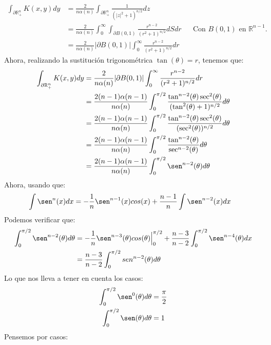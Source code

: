 \begin{homeworkProblem}
\begin{enumerate}
\begin{solucion}
\begin{align*}
        \int_{\partial \mathbb{R}^{n}_{+}}K(x,y)dy&=\frac{2}{n\alpha(n)}\int_{\partial \mathbb{R}^{n}_{+}}\frac{1}{(|z|^2+1)^{n/2}}dz\\
        &=\frac{2}{n\alpha(n)} \int_{0}^{\infty}\int_{\partial B(0,1)}\frac{r^{n-2}}{(r^2+1)^{n/2}}dSdr &&\text{Con $B(0,1)$ en $\mathbb{R}^{n-1}$.}\\
        &=\frac{2}{n\alpha(n)}|\partial B(0,1)|\int_{0}^{\infty}\frac{r^{n-2}}{(r^2+1)^{n/2}}dr
      \end{align*}
      Ahora, realizando la sustitución trigonométrica $\tan(\theta)=r$, tenemos que:
      \begin{align*}
        \int_{\partial \mathbb{R}^{n}_{+}}K(x,y)dy&=\frac{2}{n\alpha(n)}|\partial B(0,1)|\int_{0}^{\infty}\frac{r^{n-2}}{(r^2+1)^{n/2}}dr\\
        &=\frac{2(n-1)\alpha(n-1)}{n\alpha(n)}\int_{0}^{\pi/2}\frac{\tan^{n-2}(\theta)\sec^2(\theta)}{(\tan^2(\theta)+1)^{n/2}}d\theta\\
        &=\frac{2(n-1)\alpha(n-1)}{n\alpha(n)}\int_{0}^{\pi/2}\frac{\tan^{n-2}(\theta)\sec^2(\theta)}{(\sec^2(\theta))^{n/2}}d\theta\\
        &=\frac{2(n-1)\alpha(n-1)}{n\alpha(n)}\int_{0}^{\pi/2}\frac{\tan^{n-2}(\theta)}{\sec^{n-2}(\theta)}d\theta\\
        &=\frac{2(n-1)\alpha(n-1)}{n\alpha(n)}\int_{0}^{\pi/2}\sen^{n-2}(\theta)d\theta
      \end{align*}
      Ahora, usando que:
      \begin{align*}
        \int \sen^n(x)dx&=-\frac{1}{n}\sen^{n-1}(x)cos(x)+\frac{n-1}{n}\int \sen^{n-2}(x)dx
      \end{align*}
      Podemos verificar que:
      \begin{align*} 
        \int_{0}^{\pi/2} \sen^{n-2}(\theta)d\theta&=-\frac{1}{n}\sen^{n-3}(\theta)cos(\theta)\Big|_{0}^{\pi/2}+\frac{n-3}{n-2}\int_{0}^{\pi/2}\sen^{n-4}(\theta)dx\\
        &=\frac{n-3}{n-2}\int_{0}^{\pi/2}sen^{n-2}(\theta)d\theta\\
      \end{align*}
      Lo que nos lleva a tener en cuenta los casos:
      \begin{align*}
        \int_{0}^{\pi/2}\sen^0(\theta)d\theta&=\frac{\pi}{2}\\
        \int_{0}^{\pi/2}\sen(\theta)d\theta&=1
      \end{align*}
      Pensemos por casos:
      \begin{itemize}

\end{itemize}
\end{solucion}
\end{enumerate}
\end{homeworkProblem}
